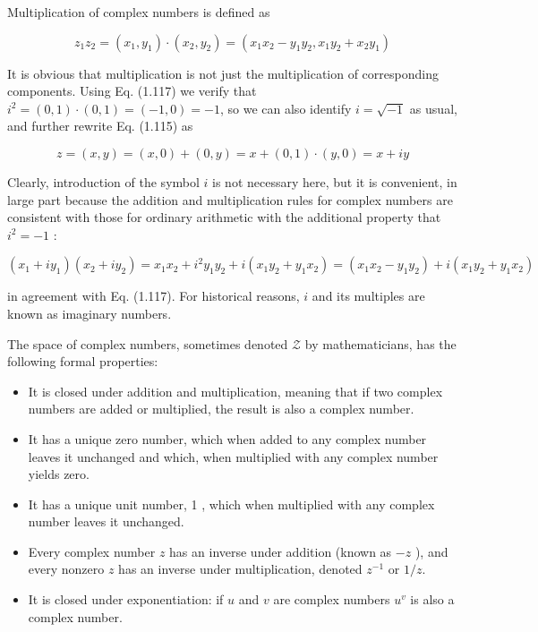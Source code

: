 \documentclass[10pt]{article}
\begin{document}
Multiplication of complex numbers is defined as


\begin{equation*}
z_{1} z_{2}=\left(x_{1}, y_{1}\right) \cdot\left(x_{2}, y_{2}\right)=\left(x_{1} x_{2}-y_{1} y_{2}, x_{1} y_{2}+x_{2} y_{1}\right) \tag{1.117}
\end{equation*}


It is obvious that multiplication is not just the multiplication of corresponding components. Using Eq. (1.117) we verify that $i^{2}=(0,1) \cdot(0,1)=(-1,0)=-1$, so we can also identify $i=\sqrt{-1}$ as usual, and further rewrite Eq. (1.115) as


\begin{equation*}
z=(x, y)=(x, 0)+(0, y)=x+(0,1) \cdot(y, 0)=x+i y \tag{1.118}
\end{equation*}


Clearly, introduction of the symbol $i$ is not necessary here, but it is convenient, in large part because the addition and multiplication rules for complex numbers are consistent with those for ordinary arithmetic with the additional property that $i^{2}=-1$ :

$$
\left(x_{1}+i y_{1}\right)\left(x_{2}+i y_{2}\right)=x_{1} x_{2}+i^{2} y_{1} y_{2}+i\left(x_{1} y_{2}+y_{1} x_{2}\right)=\left(x_{1} x_{2}-y_{1} y_{2}\right)+i\left(x_{1} y_{2}+y_{1} x_{2}\right)
$$

in agreement with Eq. (1.117). For historical reasons, $i$ and its multiples are known as imaginary numbers.

The space of complex numbers, sometimes denoted $\mathcal{Z}$ by mathematicians, has the following formal properties:

\begin{itemize}
  \item It is closed under addition and multiplication, meaning that if two complex numbers are added or multiplied, the result is also a complex number.
  \item It has a unique zero number, which when added to any complex number leaves it unchanged and which, when multiplied with any complex number yields zero.
  \item It has a unique unit number, 1 , which when multiplied with any complex number leaves it unchanged.
  \item Every complex number $z$ has an inverse under addition (known as $-z$ ), and every nonzero $z$ has an inverse under multiplication, denoted $z^{-1}$ or $1 / z$.
  \item It is closed under exponentiation: if $u$ and $v$ are complex numbers $u^{v}$ is also a complex number.
\end{itemize}
\end{document}
